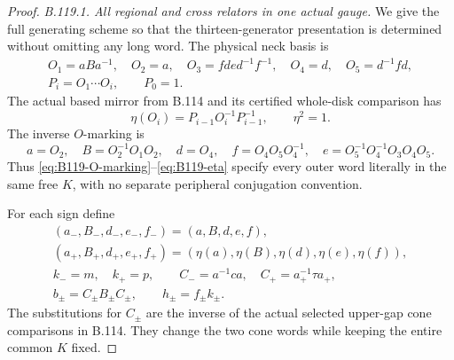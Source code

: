 \begin{proof}
\emph{B.119.1. All regional and cross relators in one actual gauge.}
We give the full generating scheme so that the thirteen-generator
presentation is determined without omitting any long word. The physical
neck basis is
\begin{equation}\label{eq:B119-O-marking}
 \begin{gathered}
 O_1=aBa^{-1},\quad O_2=a,\quad
 O_3=fde d^{-1}f^{-1},\quad O_4=d,\quad O_5=d^{-1}fd,\\
 P_i=O_1\cdots O_i,\qquad P_0=1.
 \end{gathered}
\end{equation}
The actual based mirror from B.114 and its certified whole-disk
comparison has
\begin{equation}\label{eq:B119-eta}
 \eta(O_i)=P_{i-1}O_i^{-1}P_{i-1}^{-1},\qquad \eta^2=1.
\end{equation}
The inverse $O$-marking is
\[
 a=O_2,\quad B=O_2^{-1}O_1O_2,\quad d=O_4,\quad
 f=O_4O_5O_4^{-1},\quad e=O_5^{-1}O_4^{-1}O_3O_4O_5.
\]
Thus \eqref{eq:B119-O-marking}--\eqref{eq:B119-eta} specify every
outer word literally in the same free $K$, with no separate
peripheral conjugation convention.

For each sign define
\begin{equation}\label{eq:B119-regional-substitutions}
 \begin{gathered}
 (a_-,B_-,d_-,e_-,f_-)=(a,B,d,e,f),\\
 (a_+,B_+,d_+,e_+,f_+)
       =(\eta(a),\eta(B),\eta(d),\eta(e),\eta(f)),\\
 k_-=m,\quad k_+=p,\qquad
 C_-=a^{-1}ca,\quad C_+=a_+^{-1}\tau a_+,\\
 b_\pm=C_\pm B_\pm C_\pm,\qquad h_\pm=f_\pm k_\pm.
 \end{gathered}
\end{equation}
The substitutions for $C_\pm$ are the inverse of the actual selected
upper-gap cone comparisons in B.114. They change the two cone words
while keeping the entire common $K$ fixed.


\end{proof}
